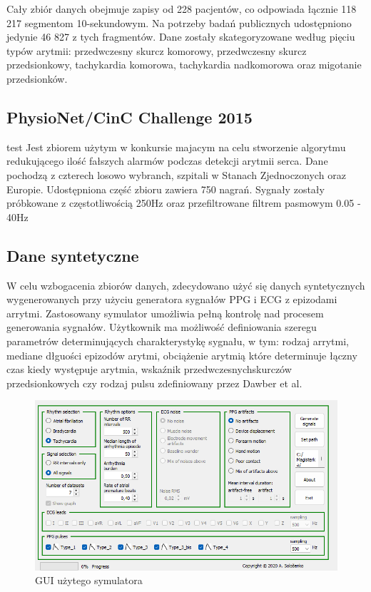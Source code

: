 \documentclass[a4paper,twoside,12pt]{book}
\begin{document}
Cały zbiór danych obejmuje zapisy od 228 pacjentów, co odpowiada łącznie 118 217 segmentom 10-sekundowym. Na potrzeby badań publicznych udostępniono jedynie 46 827 z tych fragmentów. Dane zostały skategoryzowane według pięciu typów arytmii: przedwczesny skurcz komorowy, przedwczesny skurcz przedsionkowy, tachykardia komorowa, tachykardia nadkomorowa oraz migotanie przedsionków.

\subsection{PhysioNet/CinC Challenge 2015}
test\cite{physionet_challenge_2015} Jest zbiorem użytym w konkursie majacym na celu stworzenie algorytmu redukującego ilość fałszych alarmów podczas detekcji arytmii serca. Dane pochodzą z czterech losowo wybranch, szpitali w Stanach Zjednoczonych oraz Europie. Udostępniona część zbioru zawiera 750 nagrań. Sygnały zostały próbkowane z częstotliwością 250Hz oraz przefiltrowane filtrem pasmowym 0.05 - 40Hz
\subsection{Dane syntetyczne}
W celu wzbogacenia zbiorów danych, zdecydowano użyć się danych syntetycznych wygenerowanych przy użyciu generatora sygnałów PPG i ECG z epizodami arrytmi\cite{solosenko2022}. Zastosowany symulator umożliwia pełną kontrolę nad procesem generowania sygnałów. Użytkownik ma możliwość definiowania szeregu parametrów determinujących charakterystykę sygnału, w tym: rodzaj arrytmi, mediane dłguości epizodów arytmi, obciążenie arytmią które determinuje łączny czas kiedy występuje arytmia, wskaźnik przedwczesnychskurczów przedsionkowych czy rodzaj pulsu zdefiniowany przez Dawber et al\cite{dawber1973dicrotic}.
\begin{figure}[!h]
	\centering
	\includegraphics[width=1\textwidth]{img/r4/symulator_GUI.png}
	\caption{GUI użytego symulatora}
	\label{fig:etykieta-rysunku}
\end{figure}\\
\end{document}
